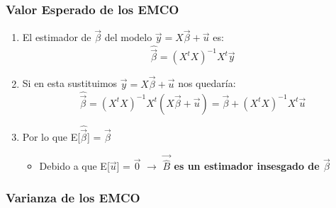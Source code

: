 \documentclass[a4paper,12pt]{article}
\newcommand{\ecuacion}[1]{\ensuremath{#1}}
\begin{document}
\subsubsection{Valor Esperado de los EMCO}
\begin{enumerate}
    \item El estimador de \ecuacion{\vec{\beta}} del modelo \ecuacion{\vec{y}=X\vec{\beta}+\vec{u}} es: 
    \[
        \hat{\vec{\beta}} = (X^tX)^{-1}X^t\vec{y}
    \]
    \item Si en esta sustituimos \ecuacion{\vec{y} = X\vec{\beta}+\vec{u}} nos quedaría:
    \[
        \hat{\vec{\beta}} = (X^tX)^{-1}X^t(X\vec{\beta}+\vec{u}) = \vec{\beta} + (X^tX)^{-1}X^t\vec{u}
    \]
    \item Por lo que E[\ecuacion{\hat{\vec{\beta}}}] = \ecuacion{\vec{\beta}}
    \begin{itemize}
        \item Debido a que E[\ecuacion{\vec{u}}] = \ecuacion{\vec{0}} \ecuacion{\rightarrow} \textbf{\ecuacion{\vec{\hat{B}}} es un estimador insesgado de \ecuacion{\vec{\beta}}}
    \end{itemize}
\end{enumerate}

\subsubsection{Varianza de los EMCO}
\end{document}
